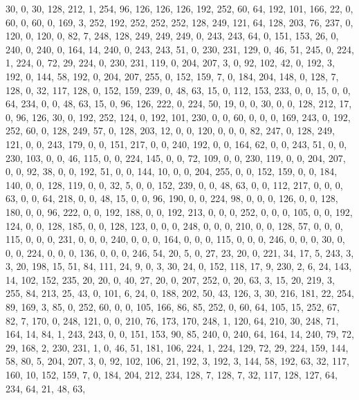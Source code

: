\begin{DoxyCode}
       30, 0, 30, 128, 212, 1, 254, 96, 126, 126, 126, 192, 252, 60, 64, 192, 101, 166, 22, 0, 60, 0, 60, 0, 169,
       3, 252, 192, 252, 252, 252, 128, 249, 121, 64, 128, 203, 76, 237, 0, 120, 0, 120, 0, 82, 7, 248, 128, 249,
       249, 249, 0, 243, 243, 64, 0, 151, 153, 26, 0, 240, 0, 240, 0, 164, 14, 240, 0, 243, 243, 51, 0, 230, 231,
       129, 0, 46, 51, 245, 0, 224, 1, 224, 0, 72, 29, 224, 0, 230, 231, 119, 0, 204, 207, 3, 0, 92, 102, 42, 0, 192,
       3, 192, 0, 144, 58, 192, 0, 204, 207, 255, 0, 152, 159, 7, 0, 184, 204, 148, 0, 128, 7, 128, 0, 32, 117,
       128, 0, 152, 159, 239, 0, 48, 63, 15, 0, 112, 153, 233, 0, 0, 15, 0, 0, 64, 234, 0, 0, 48, 63, 15, 0, 96, 126,
       222, 0, 224, 50, 19, 0, 0, 30, 0, 0, 128, 212, 17, 0, 96, 126, 30, 0, 192, 252, 124, 0, 192, 101, 230, 0,
       0, 60, 0, 0, 0, 169, 243, 0, 192, 252, 60, 0, 128, 249, 57, 0, 128, 203, 12, 0, 0, 120, 0, 0, 0, 82, 247, 0,
       128, 249, 121, 0, 0, 243, 179, 0, 0, 151, 217, 0, 0, 240, 192, 0, 0, 164, 62, 0, 0, 243, 51, 0, 0, 230, 103,
       0, 0, 46, 115, 0, 0, 224, 145, 0, 0, 72, 109, 0, 0, 230, 119, 0, 0, 204, 207, 0, 0, 92, 38, 0, 0, 192, 51,
       0, 0, 144, 10, 0, 0, 204, 255, 0, 0, 152, 159, 0, 0, 184, 140, 0, 0, 128, 119, 0, 0, 32, 5, 0, 0, 152, 239,
       0, 0, 48, 63, 0, 0, 112, 217, 0, 0, 0, 63, 0, 0, 64, 218, 0, 0, 48, 15, 0, 0, 96, 190, 0, 0, 224, 98, 0, 0,
       0, 126, 0, 0, 128, 180, 0, 0, 96, 222, 0, 0, 192, 188, 0, 0, 192, 213, 0, 0, 0, 252, 0, 0, 0, 105, 0, 0,
       192, 124, 0, 0, 128, 185, 0, 0, 128, 123, 0, 0, 0, 248, 0, 0, 0, 210, 0, 0, 128, 57, 0, 0, 0, 115, 0, 0, 0,
       231, 0, 0, 0, 240, 0, 0, 0, 164, 0, 0, 0, 115, 0, 0, 0, 246, 0, 0, 0, 30, 0, 0, 0, 224, 0, 0, 0, 136, 0, 0, 0,
       246, 54, 20, 5, 0, 27, 23, 20, 0, 221, 34, 17, 5, 243, 3, 3, 20, 198, 15, 51, 84, 111, 24, 9, 0, 3, 30, 24,
       0, 152, 118, 17, 9, 230, 2, 6, 24, 143, 14, 102, 152, 235, 20, 20, 0, 40, 27, 20, 0, 207, 252, 0, 20, 63, 3,
       15, 20, 219, 3, 255, 84, 213, 25, 43, 0, 101, 6, 24, 0, 188, 202, 50, 43, 126, 3, 30, 216, 181, 22, 254,
       89, 169, 3, 85, 0, 252, 60, 0, 0, 105, 166, 86, 85, 252, 0, 60, 64, 105, 15, 252, 67, 82, 7, 170, 0, 248, 121,
       0, 0, 210, 76, 173, 170, 248, 1, 120, 64, 210, 30, 248, 71, 164, 14, 84, 1, 243, 243, 0, 0, 151, 153, 90,
       85, 240, 0, 240, 64, 164, 14, 240, 79, 72, 29, 168, 2, 230, 231, 1, 0, 46, 51, 181, 106, 224, 1, 224, 129,
       72, 29, 224, 159, 144, 58, 80, 5, 204, 207, 3, 0, 92, 102, 106, 21, 192, 3, 192, 3, 144, 58, 192, 63, 32, 117,
       160, 10, 152, 159, 7, 0, 184, 204, 212, 234, 128, 7, 128, 7, 32, 117, 128, 127, 64, 234, 64, 21, 48, 63,

\end{DoxyCode}
